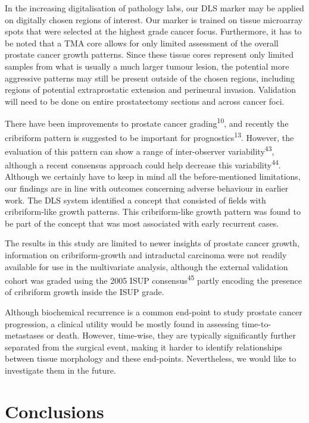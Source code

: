 \documentclass[
  12pt,
  a5,margin=2cmpaper,
]{article}
\begin{document}
In the increasing digitalisation of pathology labs, our DLS marker may
be applied on digitally chosen regions of interest. Our marker is
trained on tissue microarray spots that were selected at the highest
grade cancer focus. Furthermore, it has to be noted that a TMA core
allows for only limited assessment of the overall prostate cancer growth
patterns. Since these tissue cores represent only limited samples from
what is usually a much larger tumour lesion, the potential more
aggressive patterns may still be present outside of the chosen regions,
including regions of potential extraprostatic extension and perineural
invasion. Validation will need to be done on entire prostatectomy
sections and across cancer foci.

There have been improvements to prostate cancer
grading\textsuperscript{10}, and recently the cribriform pattern is
suggested to be important for prognostics\textsuperscript{13}. However,
the evaluation of this pattern can show a range of inter-observer
variability\textsuperscript{43}, although a recent consensus approach
could help decrease this variability\textsuperscript{44}. Although we
certainly have to keep in mind all the before-mentioned limitations, our
findings are in line with outcomes concerning adverse behaviour in
earlier work. The DLS system identified a concept that consisted of
fields with cribriform-like growth patterns. This cribriform-like growth
pattern was found to be part of the concept that was most associated
with early recurrent cases.

The results in this study are limited to newer insights of prostate
cancer growth, information on cribriform-growth and intraductal
carcinoma were not readily available for use in the multivariate
analysis, although the external validation cohort was graded using the
2005 ISUP consensus\textsuperscript{45} partly encoding the presence of
cribriform growth inside the ISUP grade.

Although biochemical recurrence is a common end-point to study prostate
cancer progression, a clinical utility would be mostly found in
assessing time-to-metastases or death. However, time-wise, they are
typically significantly further separated from the surgical event,
making it harder to identify relationships between tissue morphology and
these end-points. Nevertheless, we would like to investigate them in the
future.

\hypertarget{conclusions}{%
\section{Conclusions}\label{conclusions}}
\end{document}
